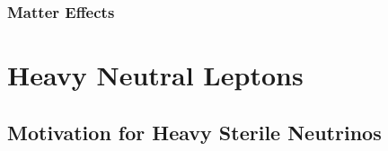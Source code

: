 \subsubsection{Matter Effects}



\section{Heavy Neutral Leptons} 

\subsection{Motivation for Heavy Sterile Neutrinos}



